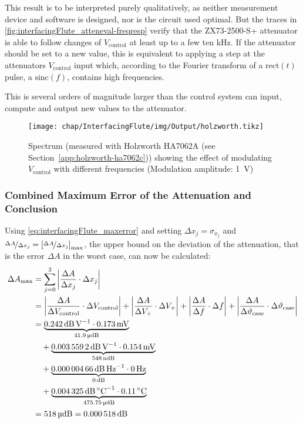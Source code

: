 This result is to be interpreted purely qualitatively, as neither measurement device and software is designed, nor is the circuit used optimal.
But the traces in \autoref{fig:interfacingFlute_atteneval-freqresp} verify that the ZX73-2500-S+ attenuator is able to follow changes of $V_\text{control}$ at least up to a few ten \si{\kHz}. If the attenuator should be set to a new value, this is equivalent to applying a step at the attenuators $V_\text{control}$ input which, according to the Fourier transform of a $\text{rect}(t)$ pulse, a $\text{sinc}(f)$, contains high frequencies.

This is several orders of magnitude larger than the control system can input, compute and output new values to the attenuator.

\begin{figure}[H]
	\centering
	\texttt{[image: chap/InterfacingFlute/img/Output/holzworth.tikz]}
	\caption[Spectrum showing maximum modulation speed]{Spectrum (measured with Holzworth HA7062A (see Section~\ref{app:holzworth-ha7062c})) showing the effect of modulating $V_\text{control}$ with different frequencies (Modulation amplitude: \SI{1}{\volt})}
	\label{fig:interfacingFlute_atteneval-freqresp}
\end{figure}

\newpage
\subsubsection{Combined Maximum Error of the Attenuation and Conclusion}
Using \autoref{eq:interfacingFlute_maxerror} and setting $\Delta x_j = \sigma_{x_j}$ and $\nicefrac{\Delta A}{\Delta x_j} = \left[\nicefrac{\Delta A}{\Delta x_j}\right]_\text{max}$, the upper bound on the deviation of the attenuation, that is the error $\Delta A$ in the worst case, can now be calculated:
\begin{align}
\Delta A_{\text{max}} &= \sum_{j=0}^{3} \left|\frac{\Delta A}{\Delta x_j} \cdot \Delta x_j\right|\\
                      &= \left|\frac{\Delta A}{\Delta V_\text{control}} \cdot \Delta V_\text{control}\right|
                      +  \left|\frac{\Delta A}{\Delta V_{+}} \cdot \Delta V_{+}\right|
                      +  \left|\frac{\Delta A}{\Delta f} \cdot \Delta f\right|
                      +  \left|\frac{\Delta A}{\Delta \vartheta_\text{case}} \cdot \Delta \vartheta_\text{case}\right|\\
                      &=       \underbrace{\SI{0.242}{\dB\per\volt} \cdot \SI{0.173}{\milli\volt}}_{\SI{41.9}{\micro\dB\relax}}\\
                      &\quad+  \underbrace{\SI{0.0035592}{\dB\per\volt} \cdot \SI{0.154}{\milli\volt}}_{\SI{548}{\nano\dB\relax}}\\
                      &\quad+  \underbrace{\SI{0.00000466}{\dB\per\hertz} \cdot \SI{0}{\hertz}}_{\SI{0}{\dB\relax}}\\
                      &\quad+  \underbrace{\SI{0.004325}{\dB\per\celsius} \cdot \SI{0.11}{\celsius}}_{\SI{475.75}{\micro\dB\relax}}\\
                      &= \SI{518}{\micro\dB\relax} = \SI{0.000518}{\dB}
\end{align}

